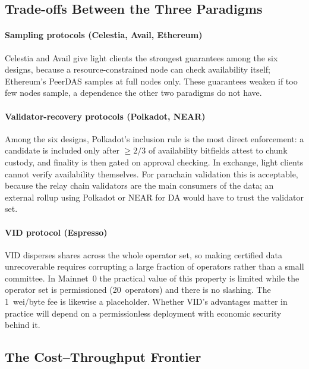 
\subsection{Trade-offs Between the Three Paradigms}
\label{sec:disc-paradigms}

\paragraph{Sampling protocols (Celestia, Avail, Ethereum)}
Celestia and Avail give light clients the strongest guarantees among the six designs, because a resource-constrained node can check availability itself; Ethereum's PeerDAS samples at full nodes only.
These guarantees weaken if too few nodes sample, a dependence the other two paradigms do not have.

\paragraph{Validator-recovery protocols (Polkadot, NEAR)}
Among the six designs, Polkadot's inclusion rule is the most direct enforcement: a candidate is included only after $\geq 2/3$ of availability bitfields attest to chunk custody, and finality is then gated on approval checking.
In exchange, light clients cannot verify availability themselves.
For parachain validation this is acceptable, because the relay chain validators are the main consumers of the data; an external rollup using Polkadot or NEAR for DA would have to trust the validator set.

\paragraph{VID protocol (Espresso)}
VID disperses shares across the whole operator set, so making certified data unrecoverable requires corrupting a large fraction of operators rather than a small committee. In Mainnet~0 the practical value of this property is limited while the operator set is permissioned (20~operators) and there is no slashing.
The 1~wei/byte fee is likewise a placeholder.
Whether VID's advantages matter in practice will depend on a permissionless deployment with economic security behind it.

\subsection{The Cost--Throughput Frontier}
\label{sec:disc-frontier}

